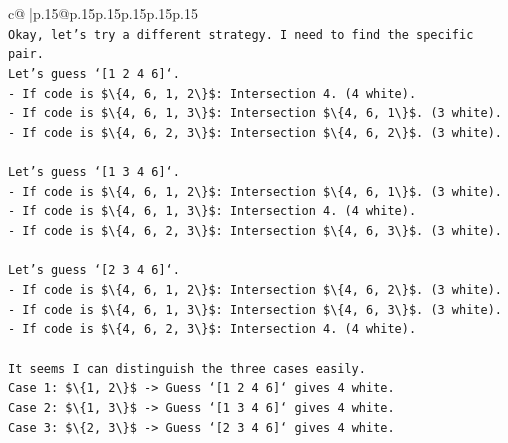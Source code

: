 \documentclass{article}
\begin{document}
{\begin{supertabular}{c@{$\;$}|p{.15\linewidth}@{}p{.15\linewidth}p{.15\linewidth}p{.15\linewidth}p{.15\linewidth}p{.15\linewidth}}
{{{\\ 
\texttt{Okay, let's try a different strategy. I need to find the specific pair.} \\
\texttt{Let's guess `{[}1 2 4 6{]}`.} \\
\texttt{{-} If code is \$\textbackslash{}\{4, 6, 1, 2\textbackslash{}\}\$: Intersection 4. (4 white).} \\
\texttt{{-} If code is \$\textbackslash{}\{4, 6, 1, 3\textbackslash{}\}\$: Intersection \$\textbackslash{}\{4, 6, 1\textbackslash{}\}\$. (3 white).} \\
\texttt{{-} If code is \$\textbackslash{}\{4, 6, 2, 3\textbackslash{}\}\$: Intersection \$\textbackslash{}\{4, 6, 2\textbackslash{}\}\$. (3 white).} \\
\\ 
\texttt{Let's guess `{[}1 3 4 6{]}`.} \\
\texttt{{-} If code is \$\textbackslash{}\{4, 6, 1, 2\textbackslash{}\}\$: Intersection \$\textbackslash{}\{4, 6, 1\textbackslash{}\}\$. (3 white).} \\
\texttt{{-} If code is \$\textbackslash{}\{4, 6, 1, 3\textbackslash{}\}\$: Intersection 4. (4 white).} \\
\texttt{{-} If code is \$\textbackslash{}\{4, 6, 2, 3\textbackslash{}\}\$: Intersection \$\textbackslash{}\{4, 6, 3\textbackslash{}\}\$. (3 white).} \\
\\ 
\texttt{Let's guess `{[}2 3 4 6{]}`.} \\
\texttt{{-} If code is \$\textbackslash{}\{4, 6, 1, 2\textbackslash{}\}\$: Intersection \$\textbackslash{}\{4, 6, 2\textbackslash{}\}\$. (3 white).} \\
\texttt{{-} If code is \$\textbackslash{}\{4, 6, 1, 3\textbackslash{}\}\$: Intersection \$\textbackslash{}\{4, 6, 3\textbackslash{}\}\$. (3 white).} \\
\texttt{{-} If code is \$\textbackslash{}\{4, 6, 2, 3\textbackslash{}\}\$: Intersection 4. (4 white).} \\
\\ 
\texttt{It seems I can distinguish the three cases easily.} \\
\texttt{Case 1: \$\textbackslash{}\{1, 2\textbackslash{}\}\$ {-}> Guess `{[}1 2 4 6{]}` gives 4 white.} \\
\texttt{Case 2: \$\textbackslash{}\{1, 3\textbackslash{}\}\$ {-}> Guess `{[}1 3 4 6{]}` gives 4 white.} \\
\texttt{Case 3: \$\textbackslash{}\{2, 3\textbackslash{}\}\$ {-}> Guess `{[}2 3 4 6{]}` gives 4 white.} \\
}}}
\end{supertabular}}
\end{document}
